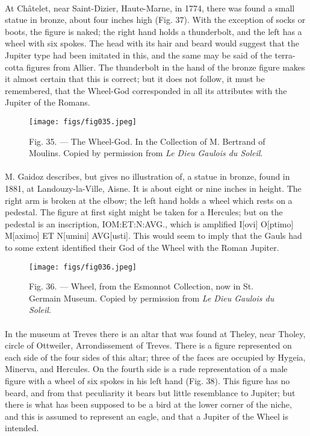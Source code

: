 \documentclass[a4paper, 11pt, oneside, polutonikogreek, english]{article}
\begin{document}
\paragraph{}
At Châtelet, near Saint-Dizier, Haute-Marne, in 1774, there was found a small statue in bronze, about four inches high (Fig. 37). With the exception of socks or boots, the figure is naked; the right hand holds a thunderbolt, and the left has a wheel with six spokes. The head with its hair and beard would suggest that the Jupiter type had been imitated in this, and the same may be said of the terra-cotta figures from Allier. The thunderbolt in the hand of the bronze figure makes it almost certain that this is correct; but it does not follow, it must be remembered, that the Wheel-God corresponded in all its attributes with the Jupiter of the Romans.

\begin{figure}[H]
\centering
\texttt{[image: figs/fig035.jpeg]}
\caption[Fig. 35. --- The Wheel-God.]{Fig. 35. --- The Wheel-God. In the Collection of M. Bertrand of Moulins. Copied by permission from \emph{Le Dieu Gaulois du Soleil}.}
\end{figure}
\paragraph{}
M. Gaidoz describes, but gives no illustration of, a statue in bronze, found in 1881, at Landouzy-la-Ville, Aisne. It is about eight or nine inches in height. The right arm is broken at the elbow; the left hand holds a wheel which rests on a pedestal. The figure at first sight might be taken for a Hercules; but on the pedestal is an inscription, IOM:ET:N:AVG., which is amplified I[ovi] O[ptimo] M[aximo] ET N[umini] AVG[usti]. This would seem to imply that the Gauls had to some extent identified their God of the Wheel with the Roman Jupiter.

\begin{figure}[H]
\centering
\texttt{[image: figs/fig036.jpeg]}
\caption[Fig. 36. --- Wheel, from the Esmonnot Collection, now in St. Germain Museum.]{Fig. 36. --- Wheel, from the Esmonnot Collection, now in St. Germain Museum. Copied by permission from \emph{Le Dieu Gaulois du Soleil}.}
\end{figure}
\paragraph{}
In the museum at Treves there is an altar that was found at Theley, near Tholey, circle of Ottweiler, Arrondissement of Treves. There is a figure represented on each side of the four sides of this altar; three of the faces are occupied by Hygeia, Minerva, and Hercules. On the fourth side is a rude representation of a male figure with a wheel of six spokes in his left hand (Fig. 38). This figure has no beard, and from that peculiarity it bears but little resemblance to Jupiter; but there is what has been supposed to be a bird at the lower corner of the niche, and this is assumed to represent an eagle, and that a Jupiter of the Wheel is intended.
\end{document}

